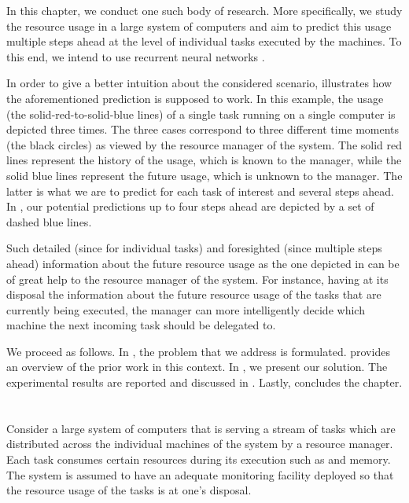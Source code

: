 In this chapter, we conduct one such body of research. More specifically, we
study the resource usage in a large system of computers and aim to predict this
usage multiple steps ahead at the level of individual tasks executed by the
machines. To this end, we intend to use recurrent neural networks
\cite{goodfellow2016}.

In order to give a better intuition about the considered scenario,
 illustrates how the aforementioned prediction is supposed
to work. In this example, the  usage (the solid-red-to-solid-blue lines)
of a single task running on a single computer is depicted three times. The three
cases correspond to three different time moments (the black circles) as viewed
by the resource manager of the system. The solid red lines represent the history
of the usage, which is known to the manager, while the solid blue lines
represent the future usage, which is unknown to the manager. The latter is what
we are to predict for each task of interest and several steps ahead. In
, our potential predictions up to four steps ahead are
depicted by a set of dashed blue lines.

Such detailed (since for individual tasks) and foresighted (since multiple steps
ahead) information about the future resource usage as the one depicted in
 can be of great help to the resource manager of the
system. For instance, having at its disposal the information about the future
resource usage of the tasks that are currently being executed, the manager can
more intelligently decide which machine the next incoming task should be
delegated to.

We proceed as follows. In , the problem that we address is
formulated.  provides an overview of the prior work in this
context. In , we present our solution. The experimental
results are reported and discussed in . Lastly,
 concludes the chapter.

\section{\problemtitle}

Consider a large system of computers that is serving a stream of tasks which are
distributed across the individual machines of the system by a resource manager.
Each task consumes certain resources during its execution such as  and
memory. The system is assumed to have an adequate monitoring facility deployed
so that the resource usage of the tasks is at one's disposal.

